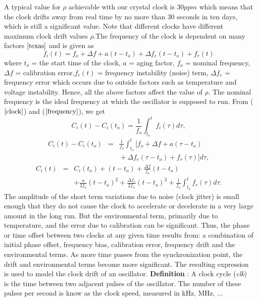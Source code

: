 \documentclass[a4paper,10pt]{report}
\begin{document}
A typical value for $\rho$ achievable with our crystal clock is $30ppm$ which means that the clock drifts away from real time by no more than 30 seconds in ten days, which is still a significant value. Note that different clocks have different maximum clock drift values
$\rho$.\newline The frequency of the clock is dependent on many factors $\cite{texas}$ and is given as
\begin{equation}
f_i(t) = f_o + \Delta f + a(t-t_o) + \Delta f_e(t-t_o) + f_r(t)
\label{frequency}
\end{equation}
where \newline $t_o$ = the start time of the clock, \newline $a$ = aging factor,  \newline $f_o$ = nominal frequency, \newline $\Delta
f$ = calibration error,\newline $f_r(t)$ = frequency instability (noise) term, \newline $\Delta f_e$ = frequency error which occurs
due to outside factors such as temperature and voltage instability. \newline Hence, all the above factors affect the value of $\rho$.
The nominal frequency is the ideal frequency at which the oscillator is supposed to run. From ($\ref{clock}$) and ($\ref{frequency}$), we get
\begin{equation}
C_i(t) - C_i(t_o) = \frac{1}{f_o} \int^{t}_{t_o}f_i(\tau)d\tau ,
\end{equation}
\begin{eqnarray*}
C_i(t) - C_i(t_o) & = & \frac{1}{f_o} \int^{t}_{t_o}{[f_o + \Delta f + a(\tau-t_o)  } \\
 &  & {} + \Delta f_e(\tau-t_o) + f_r(\tau)]d\tau ,
\label{fasika}
\end{eqnarray*}
\begin{eqnarray*}
C_i(t) & = & C_i(t_o) + (t-t_o) +\frac{\Delta f}{f_o}(t-t_o) \\
& & + \frac{a}{2f_o}(t-t_o)^2 + \frac{\Delta f_e}{2f_o}(t-t_o)^2 +
\frac{1}{f_o}\int^{t}_{t_o}{f_r(\tau)d\tau} .
\end{eqnarray*}
The amplitude of the short term variations due to noise (clock jitter) is small enough that they do not cause the clock to accelerate or decelerate in a very large amount in the long run. But the environmental term, primarily due to temperature, and the error due to calibration can be significant. Thus, the phase or time offset between two clocks at any given time results from: a combination of initial phase offset, frequency bias, calibration error, frequency drift and the environmental terms. As more time passes from the synchronization point, the drift and environmental terms become more significant. The resulting expression is used to model the clock drift of an oscillator.\newline
\textbf{Definition} : A clock cycle (\textit{clk}) is the time between two adjacent pulses of the oscillator. The number of these pulses per second is know as the clock speed, measured in kHz, MHz, ...
\end{document}
